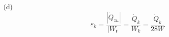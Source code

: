 (d) 
\[
\varepsilon_k = \frac{|\dot{Q}_{zu}|}{|W_t|} = \frac{\dot{Q}_k}{W_k} = \frac{\dot{Q}_k}{28W}
\]